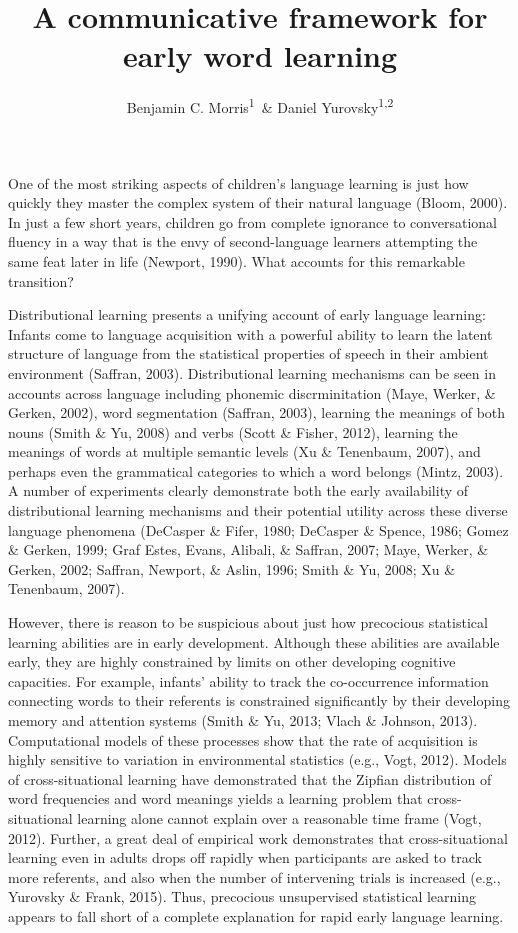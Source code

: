 \documentclass[english,,man,floatsintext]{apa6}
\author{Benjamin C. Morris\textsuperscript{1}\ \& Daniel Yurovsky\textsuperscript{1,2}}
\affiliation{
\vspace{0.5cm}
\textsuperscript{1} University of Chicago\\\textsuperscript{2} Carnegie Mellon University}
\title{A communicative framework for early word learning}
\date{}
\begin{document}
\maketitle

One of the most striking aspects of children's language learning is just how quickly they master the complex system of their natural language (Bloom, 2000). In just a few short years, children go from complete ignorance to conversational fluency in a way that is the envy of second-language learners attempting the same feat later in life (Newport, 1990). What accounts for this remarkable transition?

Distributional learning presents a unifying account of early language learning: Infants come to language acquisition with a powerful ability to learn the latent structure of language from the statistical properties of speech in their ambient environment (Saffran, 2003). Distributional learning mechanisms can be seen in accounts across language including phonemic discrminitation (Maye, Werker, \& Gerken, 2002), word segmentation (Saffran, 2003), learning the meanings of both nouns (Smith \& Yu, 2008) and verbs (Scott \& Fisher, 2012), learning the meanings of words at multiple semantic levels (Xu \& Tenenbaum, 2007), and perhaps even the grammatical categories to which a word belongs (Mintz, 2003). A number of experiments clearly demonstrate both the early availability of distributional learning mechanisms and their potential utility across these diverse language phenomena (DeCasper \& Fifer, 1980; DeCasper \& Spence, 1986; Gomez \& Gerken, 1999; Graf Estes, Evans, Alibali, \& Saffran, 2007; Maye, Werker, \& Gerken, 2002; Saffran, Newport, \& Aslin, 1996; Smith \& Yu, 2008; Xu \& Tenenbaum, 2007).

However, there is reason to be suspicious about just how precocious statistical learning abilities are in early development. Although these abilities are available early, they are highly constrained by limits on other developing cognitive capacities. For example, infants' ability to track the co-occurrence information connecting words to their referents is constrained significantly by their developing memory and attention systems (Smith \& Yu, 2013; Vlach \& Johnson, 2013). Computational models of these processes show that the rate of acquisition is highly sensitive to variation in environmental statistics (e.g., Vogt, 2012). Models of cross-situational learning have demonstrated that the Zipfian distribution of word frequencies and word meanings yields a learning problem that cross-situational learning alone cannot explain over a reasonable time frame (Vogt, 2012). Further, a great deal of empirical work demonstrates that cross-situational learning even in adults drops off rapidly when participants are asked to track more referents, and also when the number of intervening trials is increased (e.g., Yurovsky \& Frank, 2015). Thus, precocious unsupervised statistical learning appears to fall short of a complete explanation for rapid early language learning.
\end{document}
